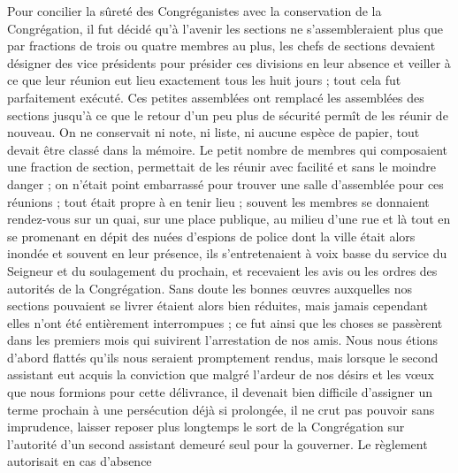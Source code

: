 Pour concilier la sûreté des Congréganistes avec la conservation de la Congrégation, il fut décidé qu'à l'avenir les sections ne s'assembleraient plus que par fractions de trois ou quatre
membres au plus, les chefs de sections devaient désigner des vice présidents pour présider ces divisions en leur absence et veiller à ce que leur réunion eut lieu exactement tous les huit jours ; tout cela fut parfaitement exécuté. Ces petites assemblées ont remplacé les assemblées des sections jusqu'à ce que le retour d'un peu plus de sécurité permît de les réunir de nouveau. On ne conservait ni note, ni liste, ni aucune espèce de papier, tout devait être classé dans la mémoire. Le petit nombre de membres qui composaient une fraction de section, permettait de les réunir avec facilité et sans le moindre danger ; on n'était point embarrassé pour trouver une salle d'assemblée pour ces réunions ; tout était propre à en tenir lieu ; souvent les membres se donnaient rendez-vous sur un quai, sur une place publique, au milieu d'une rue et là tout en se promenant en dépit des nuées d’espions de police dont la ville était alors inondée et souvent en leur présence, ils s'entretenaient à voix basse du service du Seigneur et du soulagement du prochain, et recevaient les avis ou les ordres des autorités de la Congrégation. Sans doute les bonnes œuvres auxquelles nos sections pouvaient se livrer étaient alors bien réduites, mais jamais cependant elles n'ont été entièrement interrompues ; ce fut ainsi que les choses se passèrent dans les premiers mois qui suivirent l'arrestation de nos amis. Nous nous étions d'abord flattés qu'ils nous seraient promptement rendus, mais lorsque le second assistant eut acquis la conviction que malgré l'ardeur de nos désirs et les vœux que nous formions pour cette délivrance, il devenait bien difficile d'assigner un terme prochain à une persécution déjà si prolongée, il ne crut pas pouvoir sans imprudence, laisser reposer plus longtemps le sort de la Congrégation sur l'autorité d'un second assistant demeuré seul pour la gouverner. Le règlement autorisait en cas d'absence
